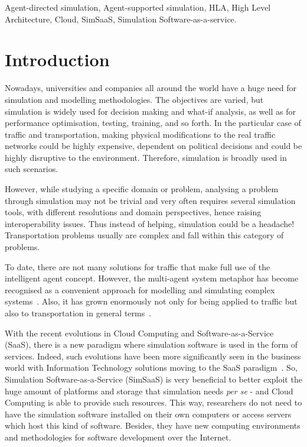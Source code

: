\documentclass[conference]{IEEEtran}
\begin{document}
\begin{keywords}
Agent-directed simulation, Agent-supported simulation, HLA, High Level Architecture, Cloud, SimSaaS, Simulation Software-as-a-service.
\end{keywords}


%



\section{Introduction}

Nowadays, universities and companies all around the world have a huge need for simulation and modelling methodologies. The objectives are varied, but simulation is widely used for decision making and what-if analysis, as well as for performance optimisation, testing, training, and so forth. In the particular case of traffic and transportation, making physical modifications to the real traffic networks could be highly expensive, dependent on political decisions and could be highly disruptive to the environment. Therefore, simulation is broadly used in such scenarios.

However, while studying a specific domain or problem, analysing a problem through simulation may not be trivial and very often requires several simulation tools, with different resolutions and domain perspectives, hence raising interoperability issues. Thus instead of helping, simulation could be a headache! Transportation problems usually are complex and fall within this category of problems. 

To date, there are not many solutions for traffic that make full use of the intelligent agent concept. However, the multi-agent system metaphor has become recognised as a convenient approach for modelling and simulating complex systems~\cite{moya2007towards}. Also, it has grown enormously not only for being applied to traffic but also to transportation in general terms~\cite{bazzan2013review}.

With the recent evolutions in Cloud Computing and Software-as-a-Service (SaaS), there is a new paradigm where simulation software is used in the form of services. Indeed, such evolutions have been more significantly seen in the business world with Information Technology solutions moving to the SaaS paradigm~\cite{sharif2010s}. So, Simulation Software-as-a-Service (SimSaaS) is very beneficial to better exploit the huge amount of platforms and storage that simulation needs \textit{per se} - and Cloud Computing is able to provide such resources. This way, researchers do not need to have the simulation software installed on their own computers or access servers which host this kind of software. Besides, they have new computing environments and methodologies for software development over the Internet. 
\end{document}
